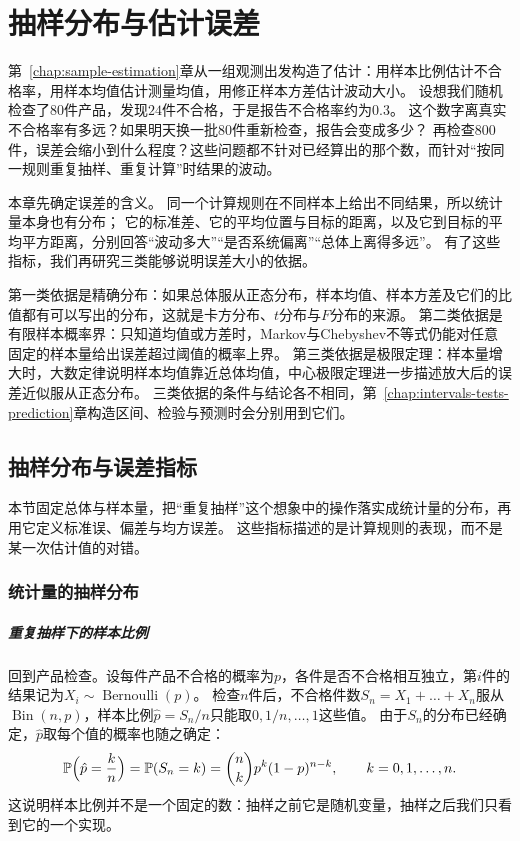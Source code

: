 \chapter{抽样分布与估计误差}
\label{chap:sampling-errors}

第~\ref{chap:sample-estimation}章从一组观测出发构造了估计：用样本比例估计不合格率，用样本均值估计测量均值，用修正样本方差估计波动大小。
设想我们随机检查了$80$件产品，发现$24$件不合格，于是报告不合格率约为$0.3$。
这个数字离真实不合格率有多远？如果明天换一批$80$件重新检查，报告会变成多少？
再检查$800$件，误差会缩小到什么程度？这些问题都不针对已经算出的那个数，而针对“按同一规则重复抽样、重复计算”时结果的波动。

本章先确定误差的含义。
同一个计算规则在不同样本上给出不同结果，所以统计量本身也有分布；
它的标准差、它的平均位置与目标的距离，以及它到目标的平均平方距离，分别回答“波动多大”“是否系统偏离”“总体上离得多远”。
有了这些指标，我们再研究三类能够说明误差大小的依据。

第一类依据是精确分布：如果总体服从正态分布，样本均值、样本方差及它们的比值都有可以写出的分布，这就是卡方分布、$t$分布与$F$分布的来源。
第二类依据是有限样本概率界：只知道均值或方差时，Markov与Chebyshev不等式仍能对任意固定的样本量给出误差超过阈值的概率上界。
第三类依据是极限定理：样本量增大时，大数定律说明样本均值靠近总体均值，中心极限定理进一步描述放大后的误差近似服从正态分布。
三类依据的条件与结论各不相同，第~\ref{chap:intervals-tests-prediction}章构造区间、检验与预测时会分别用到它们。

\section{抽样分布与误差指标}
\label{sec:samp-errors}

本节固定总体与样本量，把“重复抽样”这个想象中的操作落实成统计量的分布，再用它定义标准误、偏差与均方误差。
这些指标描述的是计算规则的表现，而不是某一次估计值的对错。

\subsection{统计量的抽样分布}

\paragraph{重复抽样下的样本比例}
回到产品检查。设每件产品不合格的概率为$p$，各件是否不合格相互独立，第$i$件的结果记为$X_i\sim\operatorname{Bernoulli}(p)$。
检查$n$件后，不合格件数$S_n=X_1+\dots+X_n$服从$\operatorname{Bin}(n,p)$，样本比例$\hat p=S_n/n$只能取$0,1/n,\dots,1$这些值。
由于$S_n$的分布已经确定，$\hat p$取每个值的概率也随之确定：
\[
  \mathbb{P}\Bigl(\hat p=\frac kn\Bigr)=\mathbb{P}(S_n=k)=\binom nk p^k(1-p)^{n-k},\qquad k=0,1,\dots,n.
\]
这说明样本比例并不是一个固定的数：抽样之前它是随机变量，抽样之后我们只看到它的一个实现。


